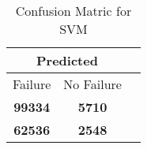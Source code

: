 \begin{table}[] 
\caption{Confusion Matric for SVM} 
\label{Table: Prediction Accuracy-DMDSVMOnlySunEKF-ignoreReflection-Reflection} 
\centering 
\begin{tabular} 
 {@{}ccc@{}} 
\toprule 
\multicolumn{2}{c}{\textbf{Predicted}}
 \\ \midrule 
\multicolumn{1}{|c|}{Failure} & 
\multicolumn{1}{c|}{No Failure}
 \\ \midrule 
\multicolumn{1}{|c|}{\color{green}\textbf{99334}} & 
\multicolumn{1}{c|}{\color{green}\textbf{5710}}
 \\ \midrule 
\multicolumn{1}{|c|}{\color{red}\textbf{62536}} & 
\multicolumn{1}{c|}{\color{red}\textbf{2548}}
 \\ \bottomrule 
\end{tabular} 
\end{table} 
